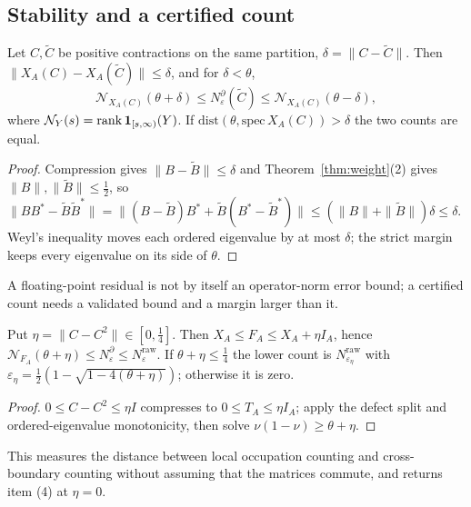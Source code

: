 \subsection{Stability and a certified count}\label{sec:stability}
\begin{theorem}\label{thm:stab}
Let $C,\tilde C$ be positive contractions on the same partition, $\delta=\|C-\tilde C\|$. Then $\|X_A(C)-X_A(\tilde C)\|\le\delta$, and for $\delta<\theta$,
\[
\mathcal N_{X_A(C)}(\theta+\delta)\le N^\partial_\varepsilon(\tilde C)\le\mathcal N_{X_A(C)}(\theta-\delta),
\]
where $\mathcal N_Y(s)=\operatorname{rank}\mathbf 1_{[s,\infty)}(Y)$. If $\mathrm{dist}(\theta,\mathrm{spec}\,X_A(C))>\delta$ the two counts are equal. 
\end{theorem}
\begin{proof}
Compression gives $\|B-\tilde B\|\le\delta$ and Theorem~\ref{thm:weight}(2) gives $\|B\|,\|\tilde B\|\le\tfrac12$, so $\|BB^*-\tilde B\tilde B^*\|=\|(B-\tilde B)B^*+\tilde B(B^*-\tilde B^*)\|\le(\|B\|+\|\tilde B\|)\delta\le\delta$. Weyl's inequality moves each ordered eigenvalue by at most $\delta$; the strict margin keeps every eigenvalue on its side of $\theta$.
\end{proof}
A floating-point residual is not by itself an operator-norm error bound; a certified count needs a validated bound and a margin larger than it.

\begin{theorem}\label{thm:nearproj}
Put $\eta=\|C-C^2\|\in[0,\tfrac14]$. Then $X_A\le F_A\le X_A+\eta I_A$, hence $\mathcal N_{F_A}(\theta+\eta)\le N^\partial_\varepsilon\le N^{\mathrm{raw}}_\varepsilon$. If $\theta+\eta\le\tfrac14$ the lower count is $N^{\mathrm{raw}}_{\varepsilon_\eta}$ with $\varepsilon_\eta=\tfrac12(1-\sqrt{1-4(\theta+\eta)})$; otherwise it is zero. 
\end{theorem}
\begin{proof}
$0\le C-C^2\le\eta I$ compresses to $0\le T_A\le\eta I_A$; apply the defect split and ordered-eigenvalue monotonicity, then solve $\nu(1-\nu)\ge\theta+\eta$.
\end{proof}
This measures the distance between local occupation counting and cross-boundary counting without assuming that the matrices commute, and returns item (4) at $\eta=0$.

